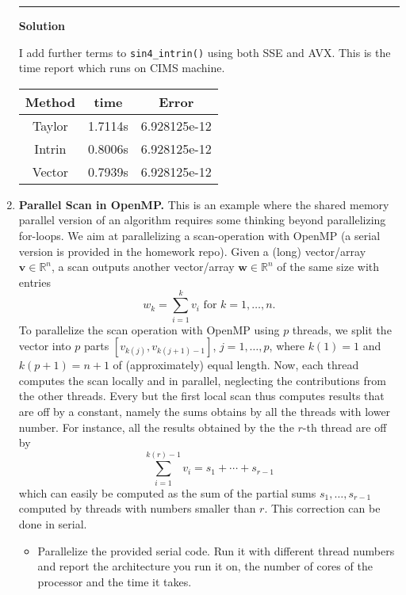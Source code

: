 \documentclass[12pt]{article}
\newcommand{\bs}{\boldsymbol}
\begin{document}
\begin{enumerate}
    \noindent\rule[0.5ex]{\linewidth}{1pt}
    
    \textbf{Solution}
    
    I add further terms to \texttt{sin4\_intrin()} using both SSE and AVX. This is the time report which runs on CIMS machine.
    
    \vspace{6pt}
\begin{center}
\linespread{1.2}\selectfont
\begin{tabular}{|c|c|c|}
\hline
Method & time & Error \\ \hline
Taylor & 1.7114s & 6.928125e-12 \\ \hline
Intrin & 0.8006s & 6.928125e-12 \\ \hline
Vector & 0.7939s & 6.928125e-12 \\ \hline
\end{tabular}
\end{center}
    
  \item {\bf Parallel Scan in OpenMP.} This is an example where the
    shared memory parallel version of an algorithm requires some
    thinking beyond parallelizing for-loops. We aim at parallelizing a
    scan-operation with OpenMP (a serial version is provided in the
    homework repo). Given a (long) vector/array $\bs v\in \mathbb
    R^n$, a scan outputs another vector/array $\bs w\in \mathbb R^n$ of
    the same size with entries
    $$
    w_k = \sum_{i=1}^k v_i \text{ for } k=1,\ldots,n.
    $$
    To parallelize the scan operation with OpenMP using $p$ threads,
    we split the vector into $p$ parts $[v_{k(j)},v_{k(j+1)-1}]$,
    $j=1,\ldots,p$, where $k(1)=1$ and $k(p+1)=n+1$ of (approximately)
    equal length. Now, each thread computes the scan locally and in
    parallel, neglecting the contributions from the other threads.
    Every but the first local scan thus computes results that are off
    by a constant, namely the sums obtains by all the threads with
    lower number.  For instance, all the results obtained by the
    the $r$-th thread are off by
    $$
    \sum_{i=1}^{k(r)-1} v_i = s_1 + \cdots + s_{r-1}
    $$
    which can easily be computed as the sum of the partial sums
    $s_1,\ldots,s_{r-1}$ computed by threads with numbers smaller than
    $r$.  This correction can be done in serial.
    \begin{itemize}
    \item Parallelize the provided serial code. Run it with different
      thread numbers and report the architecture you run it on, the
      number of cores of the processor and the time it takes.
      

\end{itemize}
\end{enumerate}
\end{document}
